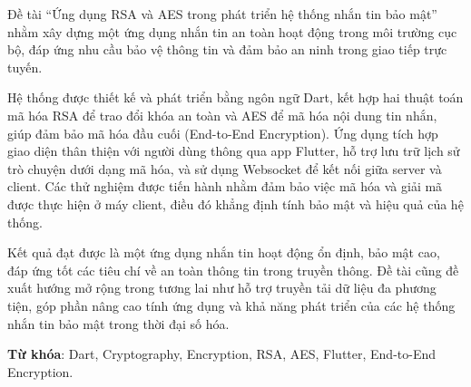 \indent Đề tài “Ứng dụng RSA và AES trong phát triển hệ thống nhắn tin bảo mật” nhằm xây dựng một ứng dụng nhắn tin an toàn hoạt động trong môi trường cục bộ, đáp ứng nhu cầu bảo vệ thông tin và đảm bảo an ninh trong giao tiếp trực tuyến.
 
\indent Hệ thống được thiết kế và phát triển bằng ngôn ngữ Dart, kết hợp hai thuật toán mã hóa RSA để trao đổi khóa an toàn và AES để mã hóa nội dung tin nhắn, giúp đảm bảo mã hóa đầu cuối (End-to-End Encryption). Ứng dụng tích hợp giao diện thân thiện với người dùng thông qua app Flutter, hỗ trợ lưu trữ lịch sử trò chuyện dưới dạng mã hóa, và sử dụng Websocket để kết nối giữa server và client. Các thử nghiệm được tiến hành nhằm đảm bảo việc mã hóa và giải mã được thực hiện ở máy client, điều đó khẳng định tính bảo mật và hiệu quả của hệ thống.
 
\indent Kết quả đạt được là một ứng dụng nhắn tin hoạt động ổn định, bảo mật cao, đáp ứng tốt các tiêu chí về an toàn thông tin trong truyền thông. Đề tài cũng đề xuất hướng mở rộng trong tương lai như hỗ trợ truyền tải dữ liệu đa phương tiện, góp phần nâng cao tính ứng dụng và khả năng phát triển của các hệ thống nhắn tin bảo mật trong thời đại số hóa.
 
\indent \textbf{ Từ khóa}: Dart, Cryptography, Encryption, RSA, AES, Flutter, End-to-End Encryption.

 
